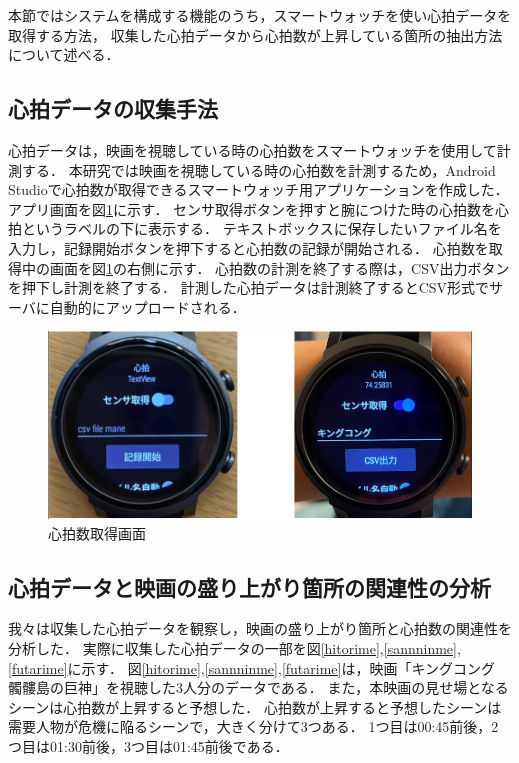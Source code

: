 本節ではシステムを構成する機能のうち，スマートウォッチを使い心拍データを取得する方法，
収集した心拍データから心拍数が上昇している箇所の抽出方法について述べる．

\subsection{心拍データの収集手法}

心拍データは，映画を視聴している時の心拍数をスマートウォッチを使用して計測する．
本研究では映画を視聴している時の心拍数を計測するため，Android Studioで心拍数が取得できるスマートウォッチ用アプリケーションを作成した．
アプリ画面を図\ref{bpmget}に示す．
センサ取得ボタンを押すと腕につけた時の心拍数を心拍というラベルの下に表示する．
テキストボックスに保存したいファイル名を入力し，記録開始ボタンを押下すると心拍数の記録が開始される．
心拍数を取得中の画面を図\ref{bpmget}の右側に示す．
心拍数の計測を終了する際は，CSV出力ボタンを押下し計測を終了する．
計測した心拍データは計測終了するとCSV形式でサーバに自動的にアップロードされる．

\begin{figure}[tbh]
    \centering
    \includegraphics[width=15cm]{images/chapter3/watchgazou.png}
    \caption{心拍数取得画面}
    \label{bpmget}
\end{figure}




\subsection{心拍データと映画の盛り上がり箇所の関連性の分析}

我々は収集した心拍データを観察し，映画の盛り上がり箇所と心拍数の関連性を分析した．
実際に収集した心拍データの一部を図\ref{hitorime},\ref{sannninme},\ref{futarime}に示す．
図\ref{hitorime},\ref{sannninme},\ref{futarime}は，映画「キングコング　髑髏島の巨神」を視聴した3人分のデータである．
また，本映画の見せ場となるシーンは心拍数が上昇すると予想した．
心拍数が上昇すると予想したシーンは需要人物が危機に陥るシーンで，大きく分けて3つある．
1つ目は00:45前後，2つ目は01:30前後，3つ目は01:45前後である．

